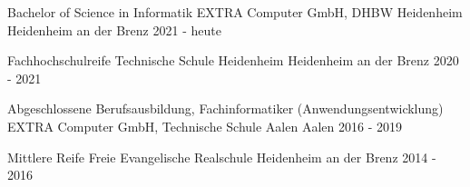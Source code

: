
\begin{cventries}
  \cventry
  {Bachelor of Science in Informatik} %
  {EXTRA Computer GmbH, DHBW Heidenheim} %
  {Heidenheim an der Brenz} %
  {2021 - heute} %
  {
  }

  \cventry
  {Fachhochschulreife} %
  {Technische Schule Heidenheim} %
  {Heidenheim an der Brenz} %
  {2020 - 2021} %
  {
  }

  \cventry
  {Abgeschlossene Berufsausbildung, Fachinformatiker (Anwendungsentwicklung)} %
  {EXTRA Computer GmbH, Technische Schule Aalen} %
  {Aalen} %
  {2016 - 2019} %
  {
  }

  \cventry
  {Mittlere Reife} %
  {Freie Evangelische Realschule} %
  {Heidenheim an der Brenz} %
  {2014 - 2016} %
  {
  }
\end{cventries}
